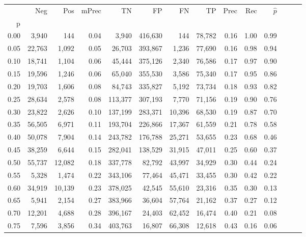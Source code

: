 \begin{tabular}{rrrrrrrrrrrrrr}
\toprule
{} &     Neg &     Pos & mPrec &       TN &       FP &      FN &      TP &  Prec &   Rec & $\hat{p}$ \\
p    &         &         &       &          &          &         &         &       &       &           \\
\midrule
0.00 &   3,940 &     144 &  0.04 &    3,940 &  416,630 &     144 &  78,782 &  0.16 &  1.00 &      0.99 \\
0.05 &  22,763 &   1,092 &  0.05 &   26,703 &  393,867 &   1,236 &  77,690 &  0.16 &  0.98 &      0.94 \\
0.10 &  18,741 &   1,104 &  0.06 &   45,444 &  375,126 &   2,340 &  76,586 &  0.17 &  0.97 &      0.90 \\
0.15 &  19,596 &   1,246 &  0.06 &   65,040 &  355,530 &   3,586 &  75,340 &  0.17 &  0.95 &      0.86 \\
0.20 &  19,703 &   1,606 &  0.08 &   84,743 &  335,827 &   5,192 &  73,734 &  0.18 &  0.93 &      0.82 \\
0.25 &  28,634 &   2,578 &  0.08 &  113,377 &  307,193 &   7,770 &  71,156 &  0.19 &  0.90 &      0.76 \\
0.30 &  23,822 &   2,626 &  0.10 &  137,199 &  283,371 &  10,396 &  68,530 &  0.19 &  0.87 &      0.70 \\
0.35 &  56,505 &   6,971 &  0.11 &  193,704 &  226,866 &  17,367 &  61,559 &  0.21 &  0.78 &      0.58 \\
0.40 &  50,078 &   7,904 &  0.14 &  243,782 &  176,788 &  25,271 &  53,655 &  0.23 &  0.68 &      0.46 \\
0.45 &  38,259 &   6,644 &  0.15 &  282,041 &  138,529 &  31,915 &  47,011 &  0.25 &  0.60 &      0.37 \\
0.50 &  55,737 &  12,082 &  0.18 &  337,778 &   82,792 &  43,997 &  34,929 &  0.30 &  0.44 &      0.24 \\
0.55 &   5,328 &   1,474 &  0.22 &  343,106 &   77,464 &  45,471 &  33,455 &  0.30 &  0.42 &      0.22 \\
0.60 &  34,919 &  10,139 &  0.23 &  378,025 &   42,545 &  55,610 &  23,316 &  0.35 &  0.30 &      0.13 \\
0.65 &   5,941 &   2,154 &  0.27 &  383,966 &   36,604 &  57,764 &  21,162 &  0.37 &  0.27 &      0.12 \\
0.70 &  12,201 &   4,688 &  0.28 &  396,167 &   24,403 &  62,452 &  16,474 &  0.40 &  0.21 &      0.08 \\
0.75 &   7,596 &   3,856 &  0.34 &  403,763 &   16,807 &  66,308 &  12,618 &  0.43 &  0.16 &      0.06 \\

\end{tabular}
